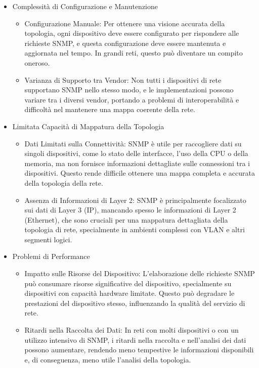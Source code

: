 \documentclass[target=bach,aauheader=,style=]{thud}
\begin{document}
\begin{itemize}
  \item Complessità di Configurazione e Manutenzione
    \begin{itemize}
      \item Configurazione Manuale: Per ottenere una visione accurata della topologia, ogni dispositivo deve essere configurato per rispondere alle richieste SNMP, e questa configurazione deve essere mantenuta e aggiornata nel tempo. In grandi reti, questo può diventare un compito oneroso.
      \item Varianza di Supporto tra Vendor: Non tutti i dispositivi di rete supportano SNMP nello stesso modo, e le implementazioni possono variare tra i diversi vendor, portando a problemi di interoperabilità e difficoltà nel mantenere una mappa coerente della rete.
    \end{itemize}

  \item Limitata Capacità di Mappatura della Topologia
    \begin{itemize}
      \item Dati Limitati sulla Connettività: SNMP è utile per raccogliere dati su singoli dispositivi, come lo stato delle interfacce, l'uso della CPU o della memoria, ma non fornisce informazioni dettagliate sulle connessioni tra i dispositivi. Questo rende difficile ottenere una mappa completa e accurata della topologia della rete.
      \item Assenza di Informazioni di Layer 2: SNMP è principalmente focalizzato sui dati di Layer 3 (IP), mancando spesso le informazioni di Layer 2 (Ethernet), che sono cruciali per una mappatura dettagliata della topologia di rete, specialmente in ambienti complessi con VLAN e altri segmenti logici.
    \end{itemize}


  \item Problemi di Performance
    \begin{itemize}
      \item Impatto sulle Risorse del Dispositivo: L'elaborazione delle richieste SNMP può consumare risorse significative del dispositivo, specialmente su dispositivi con capacità hardware limitate. Questo può degradare le prestazioni del dispositivo stesso, influenzando la qualità del servizio di rete.
      \item Ritardi nella Raccolta dei Dati: In reti con molti dispositivi o con un utilizzo intensivo di SNMP, i ritardi nella raccolta e nell'analisi dei dati possono aumentare, rendendo meno tempestive le informazioni disponibili e, di conseguenza, meno utile l'analisi della topologia.
    \end{itemize}
\end{itemize}
\end{document}
